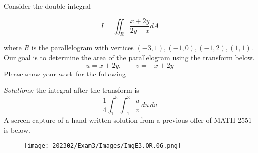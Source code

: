 \ifnum {}
\question[6] Consider the double integral

$$I=\iint_R \frac{x+2y}{2y-x} dA$$

where $R$ is the parallelogram with vertices $(-3,1), (-1,0), (-1,2), (1,1)$. Our goal is to determine the area of the parallelogram using the transform below. 
$$u=x+2y, \qquad v = -x +2y$$ 
Please show your work for the following. 

\ifnum {} {\color{DarkBlue} \textit{Solutions:} the integral after the transform is $$\displaystyle \frac14 \int_1^5\int_{-1}^3 \frac uv \, du \, dv$$
A screen capture of a hand-written solution from a previous offer of MATH 2551 is below. 
    \begin{figure}[h]
    \centering
    \texttt{[image: 202302/Exam3/Images/ImgE3.OR.06.png]}
    \end{figure}  
    
    } 
   \else
      
   \fi
    
\fi

